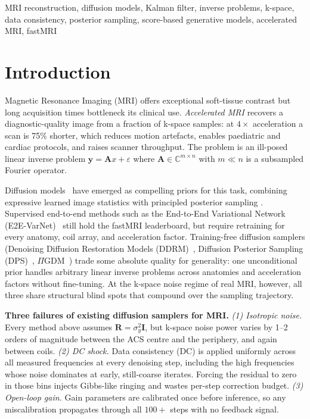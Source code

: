 \documentclass[conference]{IEEEtran}
\begin{document}
\begin{IEEEkeywords}
MRI reconstruction, diffusion models, Kalman filter, inverse problems,
k-space, data consistency, posterior sampling, score-based generative models,
accelerated MRI, fastMRI
\end{IEEEkeywords}

\section{Introduction}
\label{sec:intro}

Magnetic Resonance Imaging (MRI) offers exceptional soft-tissue contrast but long acquisition times bottleneck its clinical use. \emph{Accelerated MRI}
recovers a diagnostic-quality image from a fraction of k-space samples: at
$4\times$ acceleration a scan is 75\% shorter, which reduces motion
artefacts, enables paediatric and cardiac protocols, and raises scanner
throughput. The problem is an ill-posed linear inverse problem
$\mathbf{y}=\mathbf{A}x+\varepsilon$ where $\mathbf{A}\in\mathbb{C}^{m\times n}$
with $m\!\ll\!n$ is a subsampled Fourier operator.

Diffusion models~\cite{ho2020ddpm,song2021score,karras2022edm} have emerged
as compelling priors for this task, combining expressive learned image
statistics with principled posterior sampling
\cite{jalal2021robust,chung2022scoremri}. Supervised end-to-end methods such
as the End-to-End Variational Network
(E2E-VarNet)~\cite{sriram2020varnet} still hold the fastMRI leaderboard,
but require retraining for every anatomy, coil array, and acceleration
factor. Training-free diffusion samplers
(Denoising Diffusion Restoration Models (DDRM)~\cite{kawar2022ddrm},
Diffusion Posterior Sampling (DPS)~\cite{chung2023dps},
$\Pi$GDM~\cite{song2023pigdm}) trade some absolute quality for generality:
one unconditional prior handles arbitrary linear inverse problems across
anatomies and acceleration factors without fine-tuning. At the k-space noise
regime of real MRI, however, all three share structural blind spots that
compound over the sampling trajectory.

\textbf{Three failures of existing diffusion samplers for MRI.}
\textit{(1) Isotropic noise.} Every method above assumes
$\mathbf{R}=\sigma_y^2\mathbf{I}$, but k-space noise power varies by
1--2 orders of magnitude between the ACS centre and the periphery, and again
between coils.
\textit{(2) DC shock.} Data consistency (DC) is applied uniformly across all
measured frequencies at every denoising step, including the high
frequencies whose noise dominates at early, still-coarse iterates. Forcing
the residual to zero in those bins injects Gibbs-like ringing and wastes
per-step correction budget.
\textit{(3) Open-loop gain.} Gain parameters are calibrated once before
inference, so any miscalibration propagates through all $100+$ steps with no
feedback signal.
\end{document}
